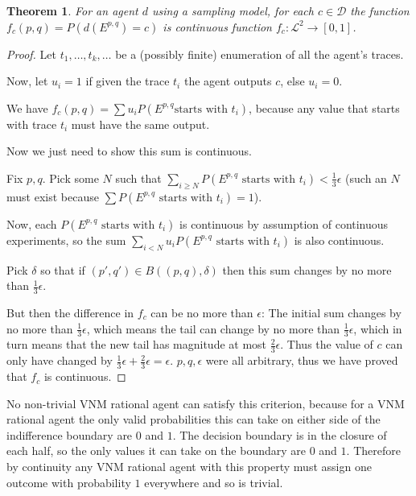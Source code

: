 \documentclass[a4paper]{book}
\newtheorem{theorem}{Theorem}[section]
\begin{document}
\begin{theorem}
For an agent $d$
using a sampling model, for each $c \in \mathcal{D}$
the function $f_c(p, q) = P(d(E^{p, q}) = c)$
is continuous function $f_c: \mathcal{L}^2 \to [0, 1]$.
\end{theorem}

\begin{proof}
Let $t_1, \ldots, t_k, \ldots$
be a (possibly finite) enumeration of all the agent's traces.

Now, let $u_i = 1$ if given the trace $t_i$ the agent outputs $c$, else $u_i = 0$.

We have $f_c(p, q) = \sum u_iP(E^{p, q} \text{starts with $t_i$})$, because any value that starts with trace $t_i$ must have the same output.

Now we just need to show this sum is continuous.

Fix $p, q$.
Pick some $N$ such that $\sum\limits_{i \geq N} P(E^{p, q} \text{ starts with } t_i) < \frac{1}{3}\epsilon$
(such an $N$
must exist because $\sum P(E^{p, q} \text{ starts with } t_i) = 1$).

Now, each $P(E^{p, q} \text{ starts with } t_i)$
is continuous by assumption of continuous experiments, so the sum
$\sum\limits_{i < N} u_i P(E^{p, q} \text{ starts with } t_i)$
is also continuous.

Pick $\delta$
so that if $(p', q') \in B((p, q), \delta)$
then this sum changes by no more than $\frac{1}{3}\epsilon$.

But then the difference in $f_c$ can be no more than $\epsilon$:
The initial sum changes by no more than $\frac{1}{3}\epsilon$,
which means the tail can change by no more than $\frac{1}{3}\epsilon$,
which in turn means that the new tail has magnitude at most $\frac{2}{3}\epsilon$.
Thus the value of $c$ can only have changed by
$\frac{1}{3}\epsilon + \frac{2}{3}\epsilon = \epsilon$.
$p, q, \epsilon$
were all arbitrary, thus we have proved that $f_c$ is continuous.
\end{proof}

No non-trivial VNM rational agent can satisfy this criterion, because
for a VNM rational agent the only valid probabilities this can take on either
side of the indifference boundary are $0$ and $1$. The decision boundary is in the
closure of each half, so the only values it can take on the boundary are $0$
and $1$. Therefore by continuity any VNM rational agent with this property must
assign one outcome with probability $1$ everywhere and so is trivial.
\end{document}
